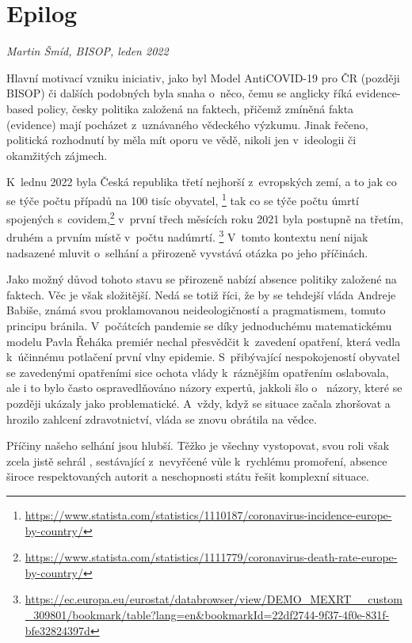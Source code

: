 \chapter{Epilog}

\textit{Martin Šmíd, BISOP, leden 2022}

\vspace{15mm}

\noindent Hlavní motivací vzniku iniciativ, jako byl Model AntiCOVID-19 pro ČR (později BISOP) či dalších podobných byla snaha o~něco, čemu se anglicky říká evidence-based policy, česky politika založená na faktech, přičemž zmíněná fakta (evidence) mají pocházet z~uznávaného vědeckého výzkumu. Jinak řečeno, politická rozhodnutí by měla mít oporu ve vědě, nikoli jen v~ideologii či okamžitých zájmech. 

K~lednu 2022 byla Česká republika třetí nejhorší z~evropských zemí, a to jak co se týče počtu případů na 100 tisíc obyvatel, \footnote{\url{https://www.statista.com/statistics/1110187/coronavirus-incidence-europe-by-country/}} tak co se týče počtu úmrtí spojených s~covidem,\footnote{\url{https://www.statista.com/statistics/1111779/coronavirus-death-rate-europe-by-country/}} v~první třech měsících roku 2021 byla postupně na třetím, druhém a prvním místě v~počtu nadúmrtí. \footnote{\url{https://ec.europa.eu/eurostat/databrowser/view/DEMO_MEXRT__custom_309801/bookmark/table?lang=en&bookmarkId=22df2744-9f37-4f0e-831f-bfe32824397d}} V~tomto kontextu není nijak nadsazené mluvit o~selhání a přirozeně vyvstává otázka po jeho příčinách. 


Jako možný důvod tohoto stavu se přirozeně nabízí absence politiky založené na faktech. Věc je však složitější. Nedá se totiž říci, že by se tehdejší vláda Andreje Babiše, známá svou proklamovanou neideologičností a pragmatismem, tomuto principu bránila. V~počátcích pandemie se díky jednoduchému matematickému modelu Pavla Řeháka premiér nechal přesvědčit k~zavedení opatření, která vedla k~účinnému potlačení první vlny epidemie. S~přibývající nespokojeností obyvatel se zavedenými opatřeními sice ochota vlády k~ráznějším opatřením oslabovala, ale i to bylo často ospravedlňováno názory expertů, jakkoli šlo o~ názory, které se později ukázaly jako problematické. A~vždy, když se situace začala zhoršovat a hrozilo zahlcení zdravotnictví, vláda se znovu obrátila na  vědce.

Příčiny našeho selhání jsou hlubší. Těžko je všechny vystopovat, svou roli však zcela jistě sehrál , sestávající z~nevyřčené vůle k~rychlému promoření, absence široce respektovaných autorit a neschopnosti státu řešit komplexní situace.

